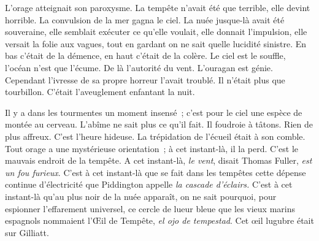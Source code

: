 \documentclass[french,twoside]{book} %
\begin{document}
L’orage atteignait son paroxysme. La tempête n’avait été que terrible, elle devint horrible. La convulsion de la mer gagna le ciel. La nuée jusque-là avait été souveraine, elle semblait exécuter ce qu’elle voulait, elle donnait l’impulsion, elle versait la folie aux vagues, tout en gardant on ne sait quelle lucidité sinistre. En bas c’était de la démence, en haut c’était de la colère. Le ciel est le souffle, l’océan n’est que l’écume. De là l’autorité du vent. L’ouragan est génie. Cependant l’ivresse de sa propre horreur l’avait troublé. Il n’était plus que tourbillon. C’était l’aveuglement enfantant la nuit.\par
Il y a dans les tourmentes un moment insensé ; c’est pour le ciel une espèce de montée au cerveau. L’abîme ne sait plus ce qu’il fait. Il foudroie à tâtons. Rien de plus affreux. C’est l’heure hideuse. La trépidation de l’écueil était à son comble. Tout orage a une mystérieuse orientation ; à cet instant-là, il la perd. C’est le mauvais endroit de la tempête. A cet instant-là, \emph{le vent}, disait Thomas Fuller, \emph{est un fou furieux}. C’est à cet instant-là que se fait dans les tempêtes cette dépense continue d’électricité que Piddington appelle \emph{la cascade d’éclairs.} C’est à cet instant-là qu’au plus noir de la nuée apparaît, on ne sait pourquoi, pour espionner l’effarement universel, ce cercle de lueur bleue que les vieux marins espagnols nommaient l’Œil  de Tempête, \emph{el ojo de tempestad}. Cet œil lugubre était sur Gilliatt.\par
\end{document}
